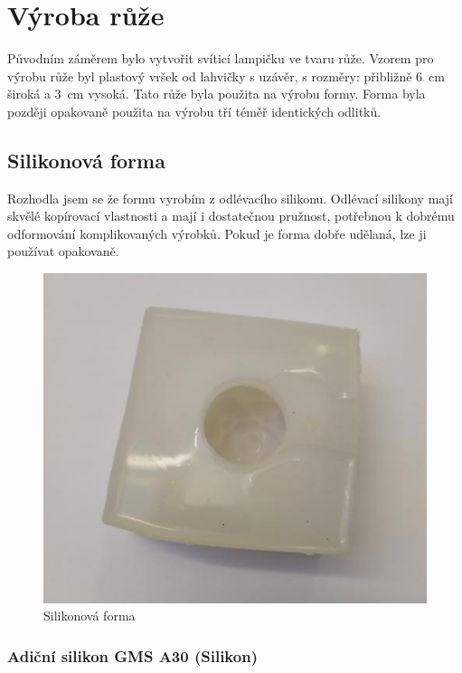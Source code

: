 \chapter{Výroba růže}
Původním záměrem bylo vytvořit svíticí lampičku ve tvaru růže. Vzorem pro výrobu růže byl plastový vršek od lahvičky s uzávěr, s rozměry: přibližně 6~cm široká a 3~cm vysoká. Tato růže byla použita na výrobu formy. Forma byla později opakovaně použita na výrobu tří téměř identických odlitků.



\section{Silikonová forma}

Rozhodla jsem se že formu vyrobím z odlévacího silikonu. Odlévací silikony mají skvělé kopírovací vlastnosti a mají i dostatečnou pružnost, potřebnou k dobrému odformování komplikovaných výrobků. Pokud je forma dobře udělaná, lze ji používat opakovaně.



\begin{figure}[htbp]
	\centering
	\includegraphics[width=0.5
	\textwidth]{img/05 odl/Silicone mold.jpg}
	\caption{Silikonová forma}
\end{figure}
 


\subsection{Adiční silikon GMS A30 (Silikon)}

